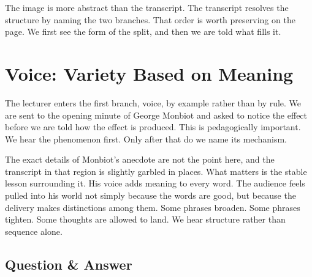 \begin{figure}[h]
\centering
{}
\end{figure}

The image is more abstract than the transcript. The transcript resolves the structure by naming the two branches. That order is worth preserving on the page. We first see the form of the split, and then we are told what fills it.

\section{Voice: Variety Based on Meaning}

The lecturer enters the first branch, voice, by example rather than by rule. We are sent to the opening minute of George Monbiot and asked to notice the effect before we are told how the effect is produced. This is pedagogically important. We hear the phenomenon first. Only after that do we name its mechanism.

The exact details of Monbiot's anecdote are not the point here, and the transcript in that region is slightly garbled in places. What matters is the stable lesson surrounding it. His voice adds meaning to every word. The audience feels pulled into his world not simply because the words are good, but because the delivery makes distinctions among them. Some phrases broaden. Some phrases tighten. Some thoughts are allowed to land. We hear structure rather than sequence alone.

\subsection{Question \& Answer}

